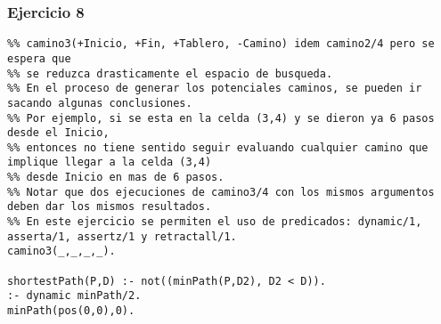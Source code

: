 \subsubsection*{Ejercicio 8}
\begin{lstlisting}
%% camino3(+Inicio, +Fin, +Tablero, -Camino) idem camino2/4 pero se espera que
%% se reduzca drasticamente el espacio de busqueda.
%% En el proceso de generar los potenciales caminos, se pueden ir sacando algunas conclusiones.
%% Por ejemplo, si se esta en la celda (3,4) y se dieron ya 6 pasos desde el Inicio,
%% entonces no tiene sentido seguir evaluando cualquier camino que implique llegar a la celda (3,4)
%% desde Inicio en mas de 6 pasos.
%% Notar que dos ejecuciones de camino3/4 con los mismos argumentos deben dar los mismos resultados.
%% En este ejercicio se permiten el uso de predicados: dynamic/1, asserta/1, assertz/1 y retractall/1.
camino3(_,_,_,_).

shortestPath(P,D) :- not((minPath(P,D2), D2 < D)).
:- dynamic minPath/2.
minPath(pos(0,0),0).
\end{lstlisting}
\vspace{1cm}